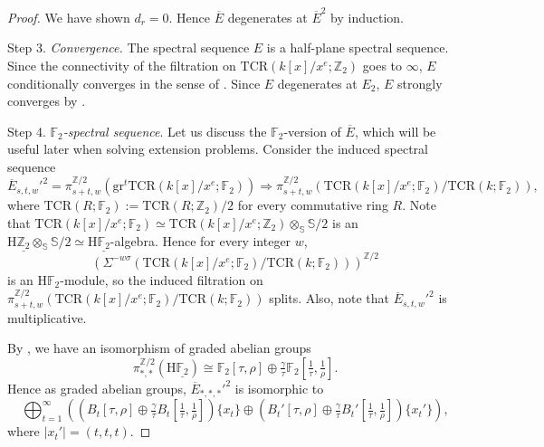 \documentclass[10pt]{amsart}
\theoremstyle{definition}
\numberwithin{equation}{section}
\newcommand{\F}{\mathbb{F}}
\newcommand{\Sphere}{\mathbb{S}}
\newcommand{\Z}{\mathbb{Z}}
\newcommand{\rH}{\mathrm{H}}
\newcommand{\ul}{\underline}
\newcommand{\ol}{\overline}
\newcommand{\gr}{\mathrm{gr}}
\newcommand{\TCR}{\mathrm{TCR}}
\begin{document}
{\begin{proof}
We have shown $d_r=0$.
Hence
$\ol{E}$ degenerates at $\overline{E}^2$ by induction.

Step 3. \emph{Convergence.}
The spectral sequence $E$ is a half-plane spectral sequence.
Since the connectivity of the filtration on $\TCR(k[x]/x^e;\Z_2)$ goes to $\infty$,
$E$ conditionally converges in the sense of \cite[Definition 5.10]{MR1718076}.
Since $E$ degenerates at $E_2$,
$E$ strongly converges by \cite[Theorem 7.1 and the following Remark]{MR1718076}.

Step 4. \emph{$\F_2$-spectral sequence}.
Let us discuss the $\F_2$-version of $\ol{E}$,
which will be useful later when solving extension problems.
Consider the induced spectral sequence
\[
\ol{E}_{s,t,w}'^2
=
\pi_{s+t,w}^{\Z/2}(\gr^t \TCR(k[x]/x^e;\F_2))
\Rightarrow
\pi_{s+t,w}^{\Z/2}(\TCR(k[x]/x^e;\F_2)/\TCR(k;\F_2)),
\]
where $\TCR(R;\F_2):=\TCR(R;\Z_2)/2$ for every commutative ring $R$. Note that
$\TCR(k[x]/x^e;\F_2)\simeq \TCR(k[x]/x^e;\Z_2)\otimes_{\Sphere}\Sphere/2$ is an $\rH\ul{\Z_2}\otimes_{\Sphere} \Sphere/2\simeq \rH\ul{\F_2}$-algebra.
Hence for every integer $w$,
\[
(\Sigma^{-w\sigma} (\TCR(k[x]/x^e;\F_2)/\TCR(k;\F_2)))^{\Z/2}
\]
is an $\rH \F_2$-module,
so
the induced filtration on $\pi_{s+t,w}^{\Z/2}(\TCR(k[x]/x^e;\F_2)/\TCR(k;\F_2))$ splits.
Also, note that $\ol{E}_{s,t,w}'^2$ is multiplicative.

By \cite[Proposition 6.2]{zbMATH01587571},
we have an isomorphism of graded abelian groups
\[
\pi_{*,*}^{\Z/2}(\rH \ul{\F_2})
\cong
\F_2[\tau,\rho] \oplus \tfrac{\gamma}{\tau} \F_2[\tfrac{1}{\tau},\tfrac{1}{\rho}].
\]
Hence as graded abelian groups,
$\ol{E}_{*,*,*}'^2$ is isomorphic to
\[
\bigoplus_{t=1}^\infty
((B_t [\tau,\rho] \oplus \tfrac{\gamma}{\tau} B_t[\tfrac{1}{\tau},\tfrac{1}{\rho}])\{x_t\} \oplus (B_t'[\tau,\rho]\oplus \tfrac{\gamma}{\tau} B_t'[\tfrac{1}{\tau},\tfrac{1}{\rho}])\{x_t'\}
),
\]
where $\lvert x_t'\rvert = (t,t,t)$.


\end{proof}}
\end{document}
